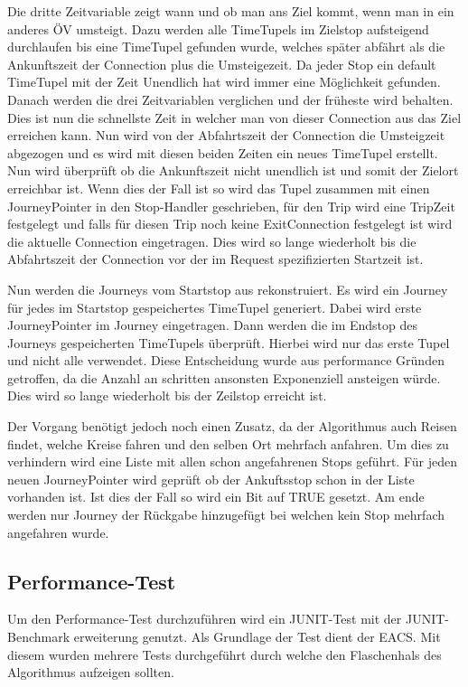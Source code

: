 Die dritte Zeitvariable zeigt wann und ob man ans Ziel kommt, wenn man in ein anderes ÖV umsteigt. Dazu werden alle TimeTupels im Zielstop aufsteigend durchlaufen bis eine TimeTupel gefunden wurde, welches später abfährt als die Ankunftszeit der Connection plus die Umsteigezeit. Da jeder Stop ein default TimeTupel mit der Zeit Unendlich hat wird immer eine Möglichkeit gefunden. 
Danach werden die drei Zeitvariablen verglichen und der früheste wird behalten. Dies ist nun die schnellste Zeit in welcher man von dieser Connection aus das Ziel erreichen kann. Nun wird von der Abfahrtszeit der Connection die Umsteigzeit abgezogen und es wird mit diesen beiden Zeiten ein neues TimeTupel erstellt. Nun wird überprüft ob die Ankunftszeit nicht unendlich ist und somit der Zielort erreichbar ist. Wenn dies der Fall ist so wird das Tupel zusammen mit einen JourneyPointer in den Stop-Handler geschrieben, für den Trip wird eine TripZeit festgelegt und falls für diesen Trip noch keine ExitConnection festgelegt ist wird die aktuelle Connection eingetragen. Dies wird so lange wiederholt bis die Abfahrtszeit der Connection vor der im Request spezifizierten Startzeit ist.
\newline


Nun werden die Journeys vom Startstop aus rekonstruiert. Es wird ein Journey für jedes im Startstop gespeichertes TimeTupel generiert. Dabei wird erste JourneyPointer im Journey eingetragen. Dann werden die im Endstop des Journeys gespeicherten TimeTupels überprüft. Hierbei wird nur das erste Tupel und nicht alle verwendet. Diese Entscheidung wurde aus performance Gründen getroffen, da die Anzahl an schritten ansonsten Exponenziell ansteigen würde. Dies wird so lange wiederholt bis der Zeilstop erreicht ist. 
\newline


Der Vorgang benötigt jedoch noch einen Zusatz, da der Algorithmus auch Reisen findet, welche Kreise fahren und den selben Ort mehrfach anfahren. Um dies zu verhindern wird eine Liste mit allen schon angefahrenen Stops geführt. Für jeden neuen JourneyPointer wird geprüft ob der Ankuftsstop schon in der Liste vorhanden ist. Ist dies der Fall so wird ein Bit auf TRUE gesetzt. Am ende werden nur Journey der Rückgabe hinzugefügt bei welchen kein Stop mehrfach angefahren wurde.

\subsection{Performance-Test}
Um den Performance-Test durchzuführen wird ein JUNIT-Test mit der JUNIT-Benchmark erweiterung genutzt. Als Grundlage der Test dient der EACS. Mit diesem wurden mehrere Tests durchgeführt durch welche den Flaschenhals des Algorithmus aufzeigen sollten.
\newline


